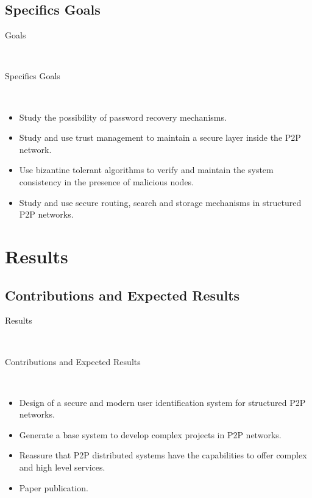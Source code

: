 \documentclass[12pt]{beamer}
\renewcommand{\frametitle}[1]{\vspace{0.2cm}\begin{huge}#1\end{huge}\\}
\renewcommand{\framesubtitle}[1]{\vspace{0.4cm} \hspace{0.4cm}\begin{large}#1\end{large}\\}
\begin{document}
  \subsection{Specifics Goals}
    \begin{frame}
    \frametitle{Goals}
    \framesubtitle{Specifics Goals}
    \begin{itemize}
      \item Study the possibility of password recovery mechanisms.
      \item Study and use trust management to maintain a
            secure layer inside the P2P network.
      \item Use bizantine tolerant algorithms to verify and maintain the
            system consistency in the presence of malicious nodes.
      \item Study and use secure routing, search and storage mechanisms in
            structured P2P networks.
    \end{itemize}
    \end{frame}

  \section{Results}
  \subsection{Contributions and Expected Results}
    \begin{frame}
    \frametitle{Results}
    \framesubtitle{Contributions and Expected Results}
      \begin{itemize}
          \item Design of a secure and modern user identification system for
                structured P2P networks.
          \item Generate a base system to develop complex projects in P2P networks.
          \item Reassure that P2P distributed systems have the capabilities to offer
                complex and high level services.
          \item Paper publication.
      \end{itemize}
    \end{frame}
\end{document}

